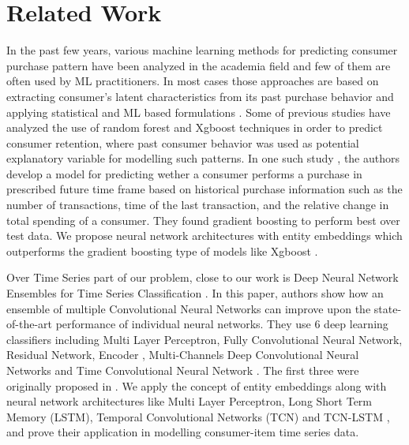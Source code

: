 \section{Related Work}
\label{sec:relatedwork}
In the past few years, various machine learning methods for predicting consumer purchase pattern have been analyzed in
the academia field and few of them are often used by ML practitioners. In most cases those approaches are based on extracting 
consumer's latent characteristics from its past purchase behavior and applying statistical and  
ML based formulations \cite{fader2009probability, choudhury2019machine}. 
Some of previous studies have analyzed the use of random forest and Xgboost techniques in order to predict 
consumer retention, where past consumer behavior was used as potential explanatory variable 
for modelling such patterns. In one such study \cite{martinez2020machine}, the authors develop a model for predicting wether a 
consumer performs a purchase in prescribed future time frame based on historical purchase information such as the number
of transactions, time of the last transaction, and the relative change in total spending of a consumer. 
They found gradient boosting to perform best over test data. We propose neural network architectures with entity embeddings
\cite{guo2016entity} which outperforms the gradient boosting type of models like Xgboost \cite{chen2016xgboost}. 

Over Time Series part of our problem,
close to our work is Deep Neural Network Ensembles for Time Series Classification \cite{fawaz2019deep}. 
In this paper, authors show how an ensemble of multiple Convolutional Neural Networks can improve upon the 
state-of-the-art performance of individual neural networks. They use 6 deep learning classifiers 
including Multi Layer Perceptron, Fully Convolutional Neural Network, Residual Network, 
Encoder \cite{serra2018towards}, Multi-Channels Deep Convolutional Neural Networks \cite{zheng2014time} and 
Time Convolutional Neural Network \cite{zhao2017convolutional}. The first three were originally proposed in \cite{wang2017time}. 
We apply the concept of entity embeddings \cite{guo2016entity} along with neural network architectures
like Multi Layer Perceptron, Long Short Term Memory (LSTM), Temporal Convolutional Networks (TCN) \cite{lea2016temporal} and 
TCN-LSTM \cite{karim2017lstm}, and prove their application in modelling consumer-item time series data.
